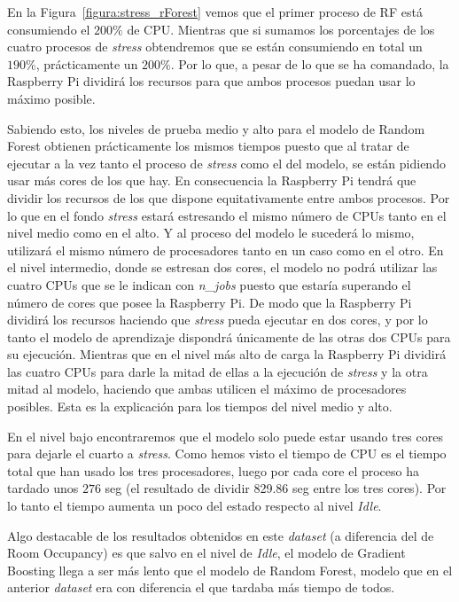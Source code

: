 \documentclass[a4paper, 12pt]{book}
\begin{document}
En la Figura~\ref{figura:stress_rForest} vemos que el primer proceso de RF está consumiendo el $200\%$ de CPU. Mientras que si sumamos los porcentajes de los cuatro procesos de \textit{stress} obtendremos que se están consumiendo en total un $190\%$, prácticamente un $200\%$. Por lo que, a pesar de lo que se ha comandado, la Raspberry Pi dividirá los recursos para que ambos procesos puedan usar lo máximo posible.

Sabiendo esto, los niveles de prueba medio y alto para el modelo de Random Forest obtienen prácticamente los mismos tiempos puesto que al tratar de ejecutar a la vez tanto el proceso de \textit{stress} como el del modelo, se están pidiendo usar más cores de los que hay. En consecuencia la Raspberry Pi tendrá que dividir los recursos de los que dispone equitativamente entre ambos procesos. Por lo que en el fondo \textit{stress} estará estresando el mismo número de CPUs tanto en el nivel medio como en el alto. Y al proceso del modelo le sucederá lo mismo, utilizará el mismo número de procesadores tanto en un caso como en el otro. En el nivel intermedio, donde se estresan dos cores, el modelo no podrá utilizar las cuatro CPUs que se le indican con \textit{n\_jobs} puesto que estaría superando el número de cores que posee la Raspberry Pi. De modo que la Raspberry Pi dividirá los recursos haciendo que \textit{stress} pueda ejecutar en dos cores, y por lo tanto el modelo de aprendizaje dispondrá únicamente de las otras dos CPUs para su ejecución. Mientras que en el nivel más alto de carga la Raspberry Pi dividirá las cuatro CPUs para darle la mitad de ellas a la ejecución de \textit{stress} y la otra mitad al modelo, haciendo que ambas utilicen el máximo de procesadores posibles. Esta es la explicación para los tiempos del nivel medio y alto. 

En el nivel bajo encontraremos que el modelo solo puede estar usando tres cores para dejarle el cuarto a \textit{stress}. Como hemos visto el tiempo de CPU es el tiempo total que han usado los tres procesadores, luego por cada core el proceso ha tardado unos $276$ seg (el resultado de dividir 829.86 seg entre los tres cores). Por lo tanto el tiempo aumenta un poco del estado respecto al nivel \textit{Idle}.

Algo destacable de los resultados obtenidos en este \textit{dataset} (a diferencia del de Room Occupancy) es que salvo en el nivel de \textit{Idle}, el modelo de Gradient Boosting llega a ser más lento que el modelo de Random Forest, modelo que en el anterior \textit{dataset} era con diferencia el que tardaba más tiempo de todos.
\end{document}
